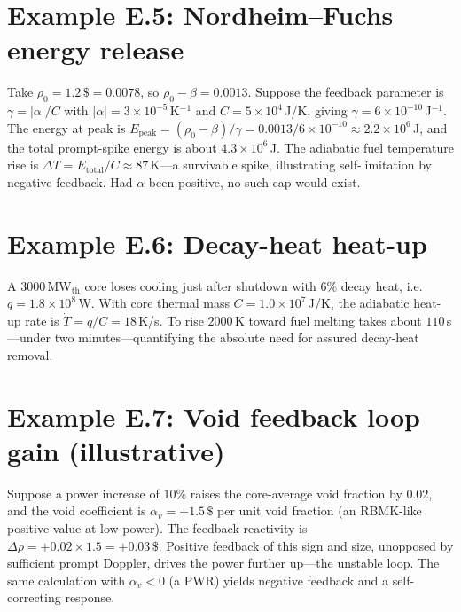\section*{Example E.5: Nordheim--Fuchs energy release}
Take $\rho_0=1.2\,\$=0.0078$, so $\rho_0-\beta=0.0013$. Suppose the feedback
parameter is $\gamma=|\alpha|/C$ with $|\alpha|=3\times10^{-5}\,$K$^{-1}$ and
$C=5\times10^{4}\,$J/K, giving $\gamma=6\times10^{-10}\,$J$^{-1}$. The energy at
peak is $E_{\text{peak}}=(\rho_0-\beta)/\gamma=0.0013/6\times10^{-10}\approx
2.2\times10^{6}\,$J, and the total prompt-spike energy is about
$4.3\times10^{6}\,$J. The adiabatic fuel temperature rise is
$\Delta T=E_{\text{total}}/C\approx 87\,$K---a survivable spike, illustrating
self-limitation by negative feedback. Had $\alpha$ been positive, no such cap
would exist.

\section*{Example E.6: Decay-heat heat-up}
A $3000\,$MW$_\text{th}$ core loses cooling just after shutdown with $6\%$ decay
heat, i.e.\ $q=1.8\times10^{8}\,$W. With core thermal mass $C=1.0\times10^{7}\,$J/K,
the adiabatic heat-up rate is $\dot T=q/C=18\,$K/s. To rise $2000\,$K toward fuel
melting takes about $110\,$s---under two minutes---quantifying the absolute need
for assured decay-heat removal.

\section*{Example E.7: Void feedback loop gain (illustrative)}
Suppose a power increase of $10\%$ raises the core-average void fraction by
$0.02$, and the void coefficient is $\alpha_v=+1.5\,\$$ per unit void fraction
(an RBMK-like positive value at low power). The feedback reactivity is
$\Delta\rho=+0.02\times1.5=+0.03\,\$$. Positive feedback of this sign and size,
unopposed by sufficient prompt Doppler, drives the power further up---the unstable
loop. The same calculation with $\alpha_v<0$ (a PWR) yields negative feedback and
a self-correcting response.
